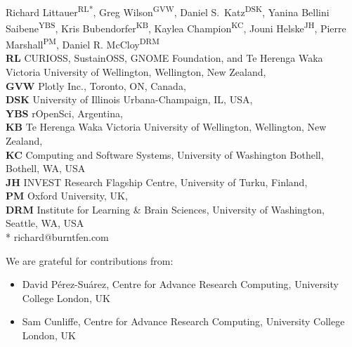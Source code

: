 \documentclass[10pt,letterpaper]{article}
\begin{document}
\vspace*{0.2in}

\begin{flushleft}
{\Large
\textbf{}
}
\newline
\\
Richard Littauer\textsuperscript{RL*},
Greg Wilson\textsuperscript{GVW},
Daniel S.\ Katz\textsuperscript{DSK},
Yanina Bellini Saibene\textsuperscript{YBS},
Kris Bubendorfer\textsuperscript{KB},
Kaylea Champion\textsuperscript{KC},
Jouni Helske\textsuperscript{JH},
Pierre Marshall\textsuperscript{PM},
Daniel R. McCloy\textsuperscript{DRM}
\\
\bigskip
\textbf{RL} CURIOSS, SustainOSS, GNOME Foundation, and Te Herenga Waka Victoria University of Wellington, Wellington, New Zealand, \\
\textbf{GVW} Plotly Inc., Toronto, ON, Canada, \\
\textbf{DSK} University of Illinois Urbana-Champaign, IL, USA, \\
\textbf{YBS} rOpenSci, Argentina, \\
\textbf{KB} Te Herenga Waka Victoria University of Wellington, Wellington, New Zealand, \\
\textbf{KC} Computing and Software Systems, University of Washington Bothell, Bothell, WA, USA \\
\textbf{JH} INVEST Research Flagship Centre, University of Turku, Finland, \\
\textbf{PM} Oxford University, UK, \\
\textbf{DRM} Institute for Learning \& Brain Sciences, University of Washington, Seattle, WA, USA \\
* richard@burntfen.com
\end{flushleft}

We are grateful for contributions from:

\begin{itemize}
\item
  David Pérez-Suárez, Centre for Advance Research Computing, University College London, UK \\
\item
  Sam Cunliffe, Centre for Advance Research Computing, University College London, UK \\
\end{itemize}
\end{document}
